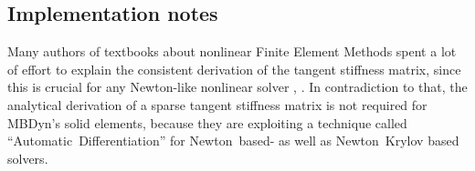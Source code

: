 \subsection{Implementation notes}
Many authors of textbooks about nonlinear Finite Element Methods spent
a lot of effort to explain the consistent derivation of the tangent stiffness matrix,
since this is crucial for any Newton-like nonlinear solver \cite{WALLRAPP1998}, \cite{BATHE2016}.
In contradiction to that, the analytical derivation of a sparse tangent stiffness matrix is not required for MBDyn's solid elements,
because they are exploiting a technique called ``Automatic~Differentiation'' for Newton~based- as well as Newton~Krylov based solvers.
